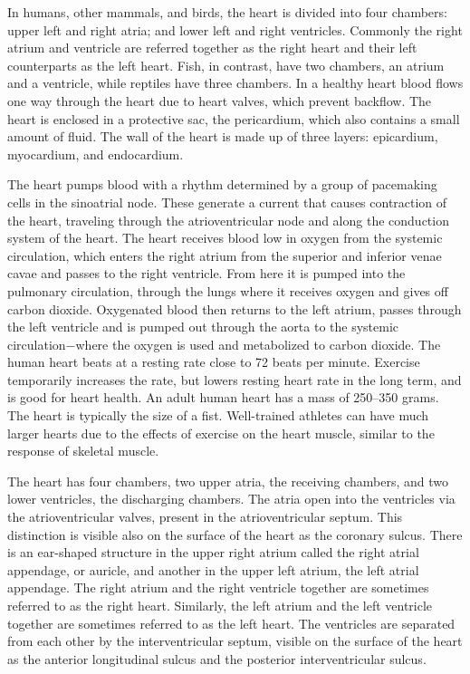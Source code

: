 \documentclass[]{book}
\begin{document}
In humans, other mammals, and birds, the heart is divided into four chambers: upper left and right atria; and lower left and right ventricles. Commonly the right atrium and ventricle are referred together as the right heart and their left counterparts as the left heart. Fish, in contrast, have two chambers, an atrium and a ventricle, while reptiles have three chambers. In a healthy heart blood flows one way through the heart due to heart valves, which prevent backflow. The heart is enclosed in a protective sac, the pericardium, which also contains a small amount of fluid. The wall of the heart is made up of three layers: epicardium, myocardium, and endocardium.

The heart pumps blood with a rhythm determined by a group of pacemaking cells in the sinoatrial node. These generate a current that causes contraction of the heart, traveling through the atrioventricular node and along the conduction system of the heart. The heart receives blood low in oxygen from the systemic circulation, which enters the right atrium from the superior and inferior venae cavae and passes to the right ventricle. From here it is pumped into the pulmonary circulation, through the lungs where it receives oxygen and gives off carbon dioxide. Oxygenated blood then returns to the left atrium, passes through the left ventricle and is pumped out through the aorta to the systemic circulation−where the oxygen is used and metabolized to carbon dioxide. The human heart beats at a resting rate close to 72 beats per minute. Exercise temporarily increases the rate, but lowers resting heart rate in the long term, and is good for heart health.
An adult human heart has a mass of 250--350 grams. The heart is typically the size of a fist. Well-trained athletes can have much larger hearts due to the effects of exercise on the heart muscle, similar to the response of skeletal muscle.

The heart has four chambers, two upper atria, the receiving chambers, and two lower ventricles, the discharging chambers. The atria open into the ventricles via the atrioventricular valves, present in the atrioventricular septum. This distinction is visible also on the surface of the heart as the coronary sulcus. There is an ear-shaped structure in the upper right atrium called the right atrial appendage, or auricle, and another in the upper left atrium, the left atrial appendage. The right atrium and the right ventricle together are sometimes referred to as the right heart. Similarly, the left atrium and the left ventricle together are sometimes referred to as the left heart. The ventricles are separated from each other by the interventricular septum, visible on the surface of the heart as the anterior longitudinal sulcus and the posterior interventricular sulcus.
\end{document}
